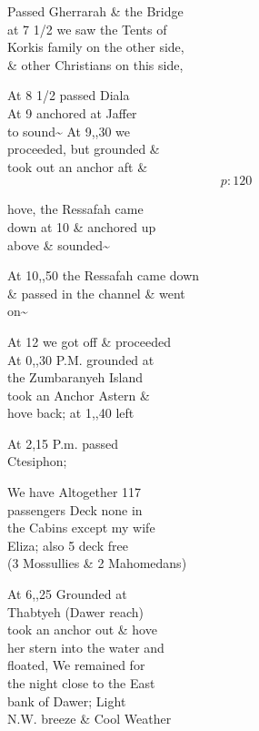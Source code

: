 \documentclass{report}
\begin{document}
	\par{
 	Passed Gherrarah \& the Bridge\ \\at 7 1/2 we saw the Tents of\ \\Korkis family on the other side,\ \\\& other Christians on this side,\ \\
	}

	\par{
 	At 8 1/2 passed Diala\ \\At 9 anchored at Jaffer\ \\to sound\~{} At 9,,30 we\ \\proceeded, but grounded \&\ \\took out an anchor aft \&\ \\
  \[p: 120 \]

	}

	\par{
 	hove, the Ressafah came\ \\down at 10 \& anchored up\ \\above \& sounded\~{}\ \\
	}

	\par{
 	At 10,,50 the Ressafah came down\ \\\& passed in the channel \& went\ \\on\~{}\ \\
	}

	\par{
 	At 12 we got off \& proceeded\ \\At 0,,30 P.M. grounded at\ \\the Zumbaranyeh Island\ \\took an Anchor Astern \&\ \\hove back; at 1,,40 left\ \\
	}

	\par{
 	At 2,15 P.m. passed\ \\Ctesiphon;\ \\
	}

	\par{
 	We have Altogether 117\ \\passengers Deck none in\ \\the Cabins except my wife\ \\Eliza; also 5 deck free\ \\(3 Mossullies \& 2 Mahomedans)\ \\
	}

	\par{
 	At 6,,25 Grounded at\ \\Thabtyeh (Dawer reach)\ \\took an anchor out \& hove\ \\her stern into the water and\ \\floated, We remained for\ \\the night close to the East\ \\bank of Dawer; Light\ \\N.W. breeze \& Cool Weather\ \\
	}
\end{document}
